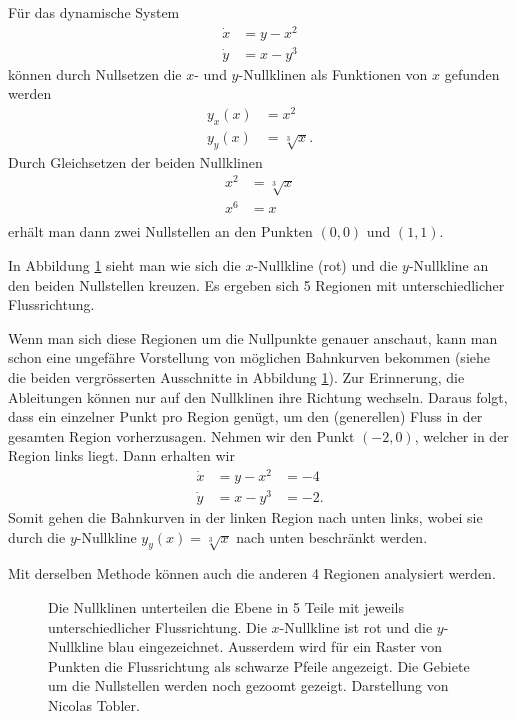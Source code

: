 \begin{beispiel} \label{poinbendix:beispiel:nullklinen}

Für das dynamische System
\begin{align*}
    \dot{x} &= y - x^2 \\
    \dot{y} &= x - y^3
\end{align*}
können durch Nullsetzen die $x$- und $y$-Nullklinen als Funktionen von $x$ gefunden werden
\begin{align*}
    y_x(x) &= x^2 \\
    y_y(x) &= \sqrt[3]{x}.
\end{align*}
Durch Gleichsetzen der beiden Nullklinen
\begin{align*}
    x^2 &= \sqrt[3]{x} \\
    x^6 &= x \\
\end{align*}
erhält man dann zwei Nullstellen an den Punkten $(0, 0)$ und $(1, 1)$.

In Abbildung \ref{poinbendix:fig:nullklinen} sieht man wie sich die $x$-Nullkline (rot) und die $y$-Nullkline an den beiden Nullstellen kreuzen.
Es ergeben sich 5 Regionen mit unterschiedlicher Flussrichtung.

Wenn man sich diese Regionen um die Nullpunkte genauer anschaut, kann man schon eine ungefähre Vorstellung von möglichen Bahnkurven bekommen (siehe die beiden vergrösserten Ausschnitte in Abbildung \ref{poinbendix:fig:nullklinen}).
Zur Erinnerung, die Ableitungen können nur auf den Nullklinen ihre Richtung wechseln.
Daraus folgt, dass ein einzelner Punkt pro Region genügt, um den (generellen) Fluss in der gesamten Region vorherzusagen.
Nehmen wir den Punkt $(-2, 0)$, welcher in der Region links liegt.
Dann erhalten wir
\begin{align*}
    \dot{x} &= y - x^2 &= -4 \\
    \dot{y} &= x - y^3 &= -2.
\end{align*}
Somit gehen die Bahnkurven in der linken Region nach unten links, wobei sie durch die $y$-Nullkline $y_y(x) = \sqrt[3]{x}$ nach unten beschränkt werden.

Mit derselben Methode können auch die anderen 4 Regionen analysiert werden.

\begin{figure}
    \centering
    \caption{Die Nullklinen unterteilen die Ebene in 5 Teile mit jeweils unterschiedlicher Flussrichtung. Die $x$-Nullkline ist rot und die $y$-Nullkline blau eingezeichnet.
    Ausserdem wird für ein Raster von Punkten die Flussrichtung als schwarze Pfeile angezeigt. Die Gebiete um die  Nullstellen werden noch gezoomt gezeigt. Darstellung von Nicolas Tobler.}
    \label{poinbendix:fig:nullklinen}
\end{figure}

\end{beispiel}

